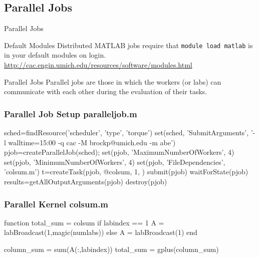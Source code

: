 \documentclass[handout]{beamer}
\begin{document}
   \subsection{Parallel Jobs}
   \begin{frame}{Parallel Jobs}
    \begin{block}{Default Modules}
     Distributed MATLAB jobs require that \texttt{module load matlab} is in your default modules on login. \\
\url{http://cac.engin.umich.edu/resources/software/modules.html}
    \end{block}
    \begin{block}{Parallel Jobs}
     Parallel jobs are those in which the workers (or labs) can communicate with each other during the evaluation of their tasks. 
    \end{block}
   \end{frame}
   
\begin{frame}[fragile]
\frametitle{Parallel Job Setup paralleljob.m}
 \begin{semiverbatim}
sched=findResource('scheduler', 'type', 'torque')
set(sched, 'SubmitArguments', '-l walltime=15:00
             -q cac -M brockp@umich.edu -m abe')
pjob=createParallelJob(sched);
set(pjob, 'MaximumNumberOfWorkers', 4)
set(pjob, 'MinimumNumberOfWorkers', 4)
set(pjob, 'FileDependencies', {'colsum.m'})
t=createTask(pjob, @colsum, 1, {})
submit(pjob)
waitForState(pjob)
results=getAllOutputArguments(pjob)
destroy(pjob)
 \end{semiverbatim}
\end{frame}

\begin{frame}[fragile]
\frametitle{Parallel Kernel colsum.m}
\begin{semiverbatim}
function total\_sum = colsum
if labindex == 1
  A = labBroadcast(1,magic(numlabs))
else
  A = labBroadcast(1)
end

column\_sum = sum(A(:,labindex))
total\_sum = gplus(column\_sum)
\end{semiverbatim}
\end{frame}
\end{document}
